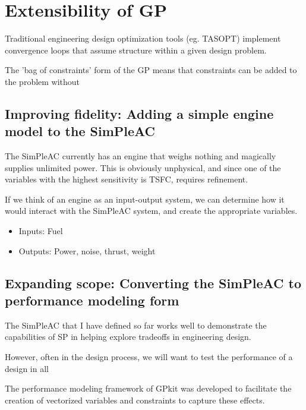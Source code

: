 \chapter{Extensibility of GP}

Traditional engineering design optimization tools (eg. TASOPT) implement convergence loops that assume structure within a given design problem. 

The 'bag of constraints' form of the GP means that constraints can be added to the problem without 

\section{Improving fidelity: Adding a simple engine model to the SimPleAC}
\label{sec:engine}

The SimPleAC currently has an engine that weighs nothing and magically supplies unlimited power. This is obviously unphysical, and since one of the variables with the highest sensitivity is TSFC, requires refinement. 

If we think of an engine as an input-output system, we can determine how it would interact with the SimPleAC system, and create the appropriate variables. 

\begin{itemize}
\item Inputs: Fuel
\item Outputs: Power, noise, thrust, weight
\end{itemize}

\section{Expanding scope: Converting the SimPleAC to performance modeling form}

The SimPleAC that I have defined so far works well to demonstrate the capabilities of \gls{SP} in helping explore tradeoffs in engineering design. 

However, often in the design process, we will want to test the performance of a design in all

The performance modeling framework of GPkit was developed to facilitate the creation of vectorized variables and constraints to capture these effects. 